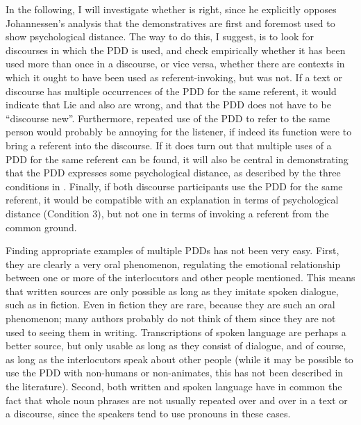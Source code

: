 \documentclass[output=paper,colorlinks,citecolor=brown]{langscibook}
\begin{document}
In the following, I will investigate whether \citet{Lie2010} is right, since he explicitly opposes Johannessen’s analysis that the demonstratives are first and foremost used to show psychological distance. The way to do this, I suggest, is to look for discourses in which the PDD is used, and check empirically whether it has been used more than once in a discourse, or vice versa, whether there are contexts in which it ought to have been used as referent-invoking, but was not. If a text or discourse has multiple occurrences of the PDD for the same referent, it would indicate that Lie and also \citet[vol. 2: 317]{TelemanEtAl1999} are wrong, and that the PDD does not have to be “discourse new”. Furthermore, repeated use of the PDD to refer to the same person would probably be annoying for the listener, if indeed its function were to bring a referent into the discourse. If it does turn out that multiple uses of a PDD for the same referent can be found, it will also be central in demonstrating that the PDD expresses some psychological distance, as described by the three conditions in . Finally, if both discourse participants use the PDD for the same referent, it would be compatible with an explanation in terms of psychological distance (Condition 3), but not one in terms of invoking a referent from the common ground.

Finding appropriate examples of multiple PDDs has not been very easy. First, they are clearly a very oral phenomenon, regulating the emotional relationship between one or more of the interlocutors and other people mentioned. This means that written sources are only possible as long as they imitate spoken dialogue, such as in fiction. Even in fiction they are rare, because they are such an oral phenomenon; many authors probably do not think of them since they are not used to seeing them in writing. Transcriptions of spoken language are perhaps a better source, but only usable as long as they consist of dialogue, and of course, as long as the interlocutors speak about other people (while it may be possible to use the PDD with non-humans or non-animates, this has not been described in the literature). Second, both written and spoken language have in common the fact that whole noun phrases are not usually repeated over and over in a text or a discourse, since the speakers tend to use pronouns in these cases. 
\end{document}

